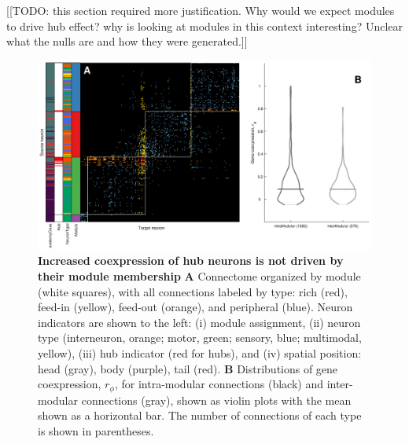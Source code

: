 \documentclass[10pt,letterpaper]{article}
\begin{document}
[[TODO: this section required more justification. Why would we expect modules to drive hub effect? why is looking at modules in this context interesting? Unclear what the nulls are and how they were generated.]]

\begin{figure}[!h]
\centering
    \includegraphics[width=1.2\textwidth]{Modules.eps}
 \caption{
 \textbf{Increased coexpression of hub neurons is not driven by their module membership}
\textbf{A} Connectome organized by module (white squares), with all connections labeled by type: rich (red), feed-in (yellow), feed-out (orange), and peripheral (blue).
Neuron indicators are shown to the left:
(i) module assignment,
(ii) neuron type (interneuron, orange; motor, green; sensory, blue; multimodal, yellow),
(iii) hub indicator (red for hubs), and
(iv) spatial position: head (gray), body (purple), tail (red).
\textbf{B} Distributions of gene coexpression, $r_\phi$, for intra-modular connections (black) and inter-modular connections (gray), shown as violin plots with the mean shown as a horizontal bar.
The number of connections of each type is shown in parentheses.
}
\end{figure}
\end{document}
